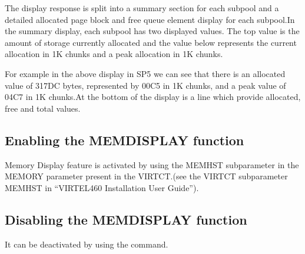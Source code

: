 \documentclass[letterpaper,10pt,english]{sphinxmanual}
\begin{document}
The display response is split into a summary section for each subpool and a detailed allocated page block and free queue element display for each subpool.In the summary display, each subpool has two displayed values. The top value is the amount of storage currently allocated and the value below represents the current allocation in 1K chunks and a peak allocation in 1K chunks.

For example in the above display in SP5 we can see that there is an allocated value of 317DC bytes, represented by 00C5 in 1K chunks, and a peak value of 04C7 in 1K chunks.At the bottom of the display is a line which provide allocated, free and total values.

\ignorespaces 

\subsection{Enabling the MEMDISPLAY function}
\label{\detokenize{audit_operations_ and_performance:enabling-the-memdisplay-function}}\label{\detokenize{audit_operations_ and_performance:index-12}}
Memory Display feature is activated by using the MEMHST subparameter in the MEMORY parameter present in the VIRTCT.(see the VIRTCT subparameter MEMHST in “VIRTEL460 Installation User Guide”).

\ignorespaces 

\subsection{Disabling the MEMDISPLAY function}
\label{\detokenize{audit_operations_ and_performance:disabling-the-memdisplay-function}}\label{\detokenize{audit_operations_ and_performance:index-13}}
It can be deactivated by using the command.

\begin{sphinxVerbatim}[commandchars=\\\{\}]
 
\end{sphinxVerbatim}
\end{document}
